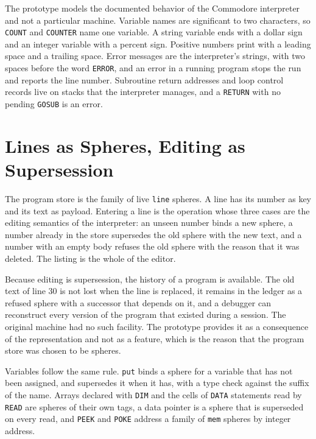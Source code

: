\documentclass[11pt,oneside]{report}
\theoremstyle{plain}
\theoremstyle{definition}
\theoremstyle{remark}
\newcommand{\code}[2][Python]{}
\begin{document}
The prototype models the documented behavior of the Commodore interpreter \cite{c64prg} and not a particular machine. Variable names are significant to two characters, so \texttt{COUNT} and \texttt{COUNTER} name one variable. A string variable ends with a dollar sign and an integer variable with a percent sign. Positive numbers print with a leading space and a trailing space. Error messages are the interpreter's strings, with two spaces before the word \texttt{ERROR}, and an error in a running program stops the run and reports the line number. Subroutine return addresses and loop control records live on stacks that the interpreter manages, and a \texttt{RETURN} with no pending \texttt{GOSUB} is an error.

\section{Lines as Spheres, Editing as Supersession}

The program store is the family of live \texttt{line} spheres. A line has its number as key and its text as payload. Entering a line is the operation whose three cases are the editing semantics of the interpreter: an unseen number binds a new sphere, a number already in the store supersedes the old sphere with the new text, and a number with an empty body refuses the old sphere with the reason that it was deleted. The listing is the whole of the editor.

\code{ex_basic_enter}

Because editing is supersession, the history of a program is available. The old text of line 30 is not lost when the line is replaced, it remains in the ledger as a refused sphere with a successor that depends on it, and a debugger can reconstruct every version of the program that existed during a session. The original machine had no such facility. The prototype provides it as a consequence of the representation and not as a feature, which is the reason that the program store was chosen to be spheres.

Variables follow the same rule. \texttt{put} binds a sphere for a variable that has not been assigned, and supersedes it when it has, with a type check against the suffix of the name. Arrays declared with \texttt{DIM} and the cells of \texttt{DATA} statements read by \texttt{READ} are spheres of their own tags, a data pointer is a sphere that is superseded on every read, and \texttt{PEEK} and \texttt{POKE} address a family of \texttt{mem} spheres by integer address.
\end{document}

